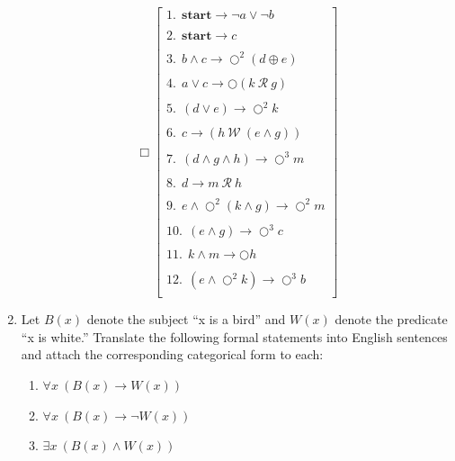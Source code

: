 \documentclass[12pt]{article}
\begin{document}
\begin{enumerate}
\[
\Box	\begin{bmatrix}
	
	1.~~   \textbf{start} \rightarrow \neg a \vee \neg b  \\
	\ \\
	2.~~   \textbf{start} \rightarrow c\\
	\ \\    
	3.~~   b \wedge c \rightarrow \bigcirc^{2} (d \oplus e)\\
	\ \\    
	4.~~   a \vee c \rightarrow \bigcirc (k~\mathcal{R}~g)\\
	\ \\    
	5.~~   (d \vee e) \rightarrow \bigcirc^{2} k\\
	\ \\    
	6.~~   c \rightarrow (h ~\mathcal{W}~ (e \wedge g))\\
	\ \\    
	7.~~   (d \wedge g \wedge h) \rightarrow \bigcirc^{3} m\\
	\ \\
	8.~~   d \rightarrow m~\mathcal{R}~h \\
	\ \\
	9.~~   e \wedge \bigcirc^{2} (k \wedge g) \rightarrow \bigcirc^{2}m \\
	\ \\
	10.~~  (e \wedge g) \rightarrow \bigcirc^{3} c\\
	\ \\
	11.~~  k \wedge m \rightarrow \bigcirc h\\
	\ \\
	12.~~  (e \wedge \bigcirc^{2}k) \rightarrow \bigcirc^{3}b \\
	
\end{bmatrix}
\]





\item Let $B(x)$ denote the subject ``x is a bird'' and $W(x)$ denote the predicate ``x is white.'' Translate the following formal statements into English sentences and attach the corresponding categorical form to each:

\begin{enumerate}
\item $\forall x~(B(x) \rightarrow W(x))$


\item $\forall x~(B(x) \rightarrow \neg W(x))$ 


\item $\exists x~(B(x) \wedge W(x))$ 



\end{enumerate}
\end{enumerate}
\end{document}
